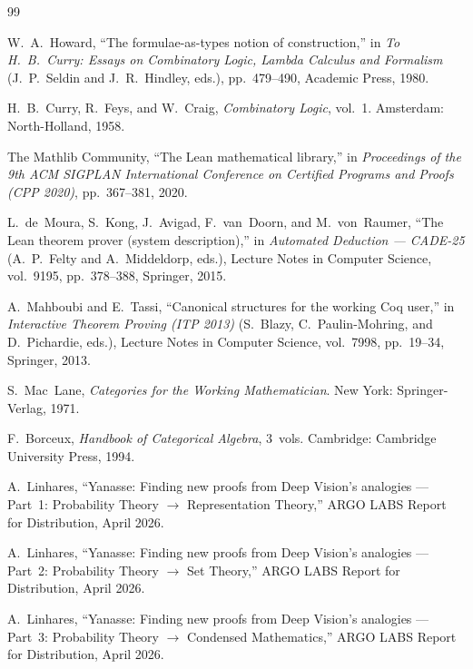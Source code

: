 \documentclass[11pt]{article}
\theoremstyle{definition}
\theoremstyle{remark}
\begin{document}
\begin{thebibliography}{99}

W.~A.~Howard,
``The formulae-as-types notion of construction,''
in \emph{To H.~B.~Curry: Essays on Combinatory Logic, Lambda
Calculus and Formalism} (J.~P.~Seldin and J.~R.~Hindley, eds.),
pp.~479--490, Academic Press, 1980.

H.~B.~Curry, R.~Feys, and W.~Craig,
\emph{Combinatory Logic}, vol.~1.
Amsterdam: North-Holland, 1958.

The Mathlib Community,
``The Lean mathematical library,''
in \emph{Proceedings of the 9th ACM SIGPLAN International Conference
on Certified Programs and Proofs (CPP 2020)}, pp.~367--381, 2020.

L.~de~Moura, S.~Kong, J.~Avigad, F.~van~Doorn, and M.~von~Raumer,
``The Lean theorem prover (system description),''
in \emph{Automated Deduction --- CADE-25}
(A.~P.~Felty and A.~Middeldorp, eds.),
Lecture Notes in Computer Science, vol.~9195, pp.~378--388,
Springer, 2015.

A.~Mahboubi and E.~Tassi,
``Canonical structures for the working Coq user,''
in \emph{Interactive Theorem Proving (ITP 2013)}
(S.~Blazy, C.~Paulin-Mohring, and D.~Pichardie, eds.),
Lecture Notes in Computer Science, vol.~7998, pp.~19--34,
Springer, 2013.

S.~Mac~Lane,
\emph{Categories for the Working Mathematician}.
New York: Springer-Verlag, 1971.

F.~Borceux,
\emph{Handbook of Categorical Algebra}, 3~vols.
Cambridge: Cambridge University Press, 1994.

A.~Linhares,
``Yanasse: Finding new proofs from Deep Vision's analogies --- Part~1:
Probability Theory $\to$ Representation Theory,''
ARGO LABS Report for Distribution, April 2026.

A.~Linhares,
``Yanasse: Finding new proofs from Deep Vision's analogies --- Part~2:
Probability Theory $\to$ Set Theory,''
ARGO LABS Report for Distribution, April 2026.

A.~Linhares,
``Yanasse: Finding new proofs from Deep Vision's analogies --- Part~3:
Probability Theory $\to$ Condensed Mathematics,''
ARGO LABS Report for Distribution, April 2026.


\end{thebibliography}
\end{document}
